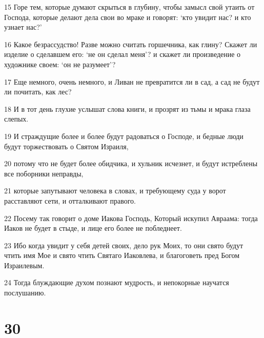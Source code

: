 \par 15 Горе тем, которые думают скрыться в глубину, чтобы замысл свой утаить от Господа, которые делают дела свои во мраке и говорят: `кто увидит нас? и кто узнает нас?'
\par 16 Какое безрассудство! Разве можно считать горшечника, как глину? Скажет ли изделие о сделавшем его: `не он сделал меня'? и скажет ли произведение о художнике своем: `он не разумеет'?
\par 17 Еще немного, очень немного, и Ливан не превратится ли в сад, а сад не будут ли почитать, как лес?
\par 18 И в тот день глухие услышат слова книги, и прозрят из тьмы и мрака глаза слепых.
\par 19 И страждущие более и более будут радоваться о Господе, и бедные люди будут торжествовать о Святом Израиля,
\par 20 потому что не будет более обидчика, и хульник исчезнет, и будут истреблены все поборники неправды,
\par 21 которые запутывают человека в словах, и требующему суда у ворот расставляют сети, и отталкивают правого.
\par 22 Посему так говорит о доме Иакова Господь, Который искупил Авраама: тогда Иаков не будет в стыде, и лице его более не побледнеет.
\par 23 Ибо когда увидит у себя детей своих, дело рук Моих, то они свято будут чтить имя Мое и свято чтить Святаго Иаковлева, и благоговеть пред Богом Израилевым.
\par 24 Тогда блуждающие духом познают мудрость, и непокорные научатся послушанию.

\chapter{30}

